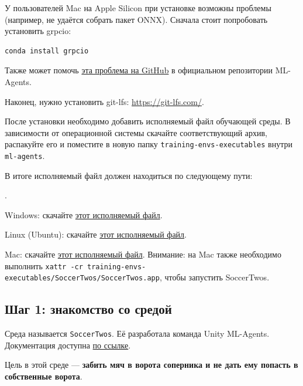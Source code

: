 \documentclass[11pt,a4paper]{article}
\begin{document}
У пользователей Mac на Apple Silicon при установке возможны проблемы (например, не удаётся собрать пакет ONNX). Сначала стоит попробовать установить grpcio:

\begin{lstlisting}
conda install grpcio
\end{lstlisting}

Также может помочь \href{https://github.com/Unity-Technologies/ml-agents/issues/6019}{эта проблема на GitHub} в официальном репозитории ML-Agents.

Наконец, нужно установить git-lfs: \url{https://git-lfs.com/}.

После установки необходимо добавить исполняемый файл обучающей среды. В зависимости от операционной системы скачайте соответствующий архив, распакуйте его и поместите в новую папку \texttt{training-envs-executables} внутри \texttt{ml-agents}.

В итоге исполняемый файл должен находиться по следующему пути:\par\noindent{}.

Windows: скачайте \href{https://drive.google.com/file/d/1sqFxbEdTMubjVktnV4C6ICjp89wLhUcP/view?usp=sharing}{этот исполняемый файл}.

Linux (Ubuntu): скачайте \href{https://drive.google.com/file/d/1KuqBKYiXiIcU4kNMqEzhgypuFP5_45CL/view?usp=sharing}{этот исполняемый файл}.

Mac: скачайте \href{https://drive.google.com/drive/folders/1h7YB0qwjoxxghApQdEUQmk95ZwIDxrPG?usp=share_link}{этот исполняемый файл}. Внимание: на Mac также необходимо выполнить \texttt{xattr\ -cr\ training-envs-executables/SoccerTwos/SoccerTwos.app}, чтобы запустить SoccerTwos.

\subsection{Шаг 1: знакомство со средой}\label{step-1-understand-the-environment}

Среда называется \texttt{SoccerTwos}. Её разработала команда Unity ML-Agents. Документация доступна \href{https://github.com/Unity-Technologies/ml-agents/blob/develop/docs/Learning-Environment-Examples.md\#soccer-twos}{по ссылке}.

Цель в этой среде --- \textbf{забить мяч в ворота соперника и не дать ему попасть в собственные ворота}.

\end{document}
